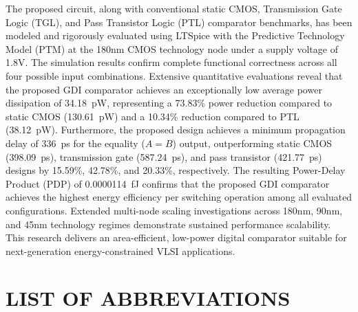 \documentclass[12pt,a4paper,oneside]{report}
\begin{document}
\noindent The proposed circuit, along with conventional static CMOS, Transmission Gate Logic (TGL), and Pass Transistor Logic (PTL) comparator benchmarks, has been modeled and rigorously evaluated using LTSpice with the Predictive Technology Model (PTM) at the 180nm CMOS technology node under a supply voltage of 1.8V. The simulation results confirm complete functional correctness across all four possible input combinations. Extensive quantitative evaluations reveal that the proposed GDI comparator achieves an exceptionally low average power dissipation of 34.18~pW, representing a 73.83\% power reduction compared to static CMOS (130.61~pW) and a 10.34\% reduction compared to PTL (38.12~pW). Furthermore, the proposed design achieves a minimum propagation delay of 336~ps for the equality ($A=B$) output, outperforming static CMOS (398.09~ps), transmission gate (587.24~ps), and pass transistor (421.77~ps) designs by 15.59\%, 42.78\%, and 20.33\%, respectively. The resulting Power-Delay Product (PDP) of 0.0000114~fJ confirms that the proposed GDI comparator achieves the highest energy efficiency per switching operation among all evaluated configurations. Extended multi-node scaling investigations across 180nm, 90nm, and 45nm technology regimes demonstrate sustained performance scalability. This research delivers an area-efficient, low-power digital comparator suitable for next-generation energy-constrained VLSI applications.

\clearpage

\tableofcontents
\clearpage

\listoffigures
\clearpage

\listoftables
\clearpage

\chapter*{LIST OF ABBREVIATIONS}
\end{document}
